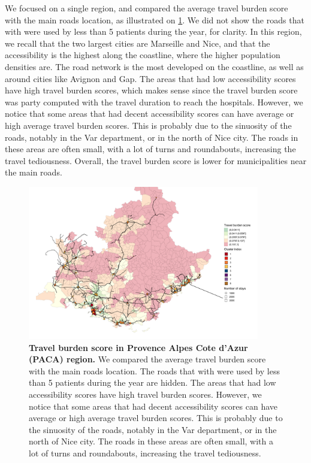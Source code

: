 We focused on a single region, and compared the average travel burden score with
the main roads location, as illustrated on \cref{fig:travel-burden-paca}. We did
not show the roads that with were used by less than 5 patients during the year,
for clarity. In this region, we recall that the two largest cities are Marseille
and Nice, and that the accessibility is the highest along the coastline, where
the higher population densities are. The road network is the most developed on
the coastline, as well as around cities like Avignon and Gap. The areas that had
low accessibility scores have high travel burden scores, which makes sense since
the travel burden score was party computed with the travel duration to reach the
hospitals. However, we notice that some areas that had decent accessibility
scores can have average or high average travel burden scores. This is probably
due to the sinuosity of the roads, notably in the Var department, or in the
north of Nice city. The roads in these areas are often small, with a lot of
turns and roundabouts, increasing the travel tediousness. Overall, the travel
burden score is lower for municipalities near the main roads.

\begin{figure}[h!]
    \includegraphics[width=0.9\textwidth]{images/routes/fig7.png}
    \centering
    \caption{
        \textbf{Travel burden score in Provence Alpes Cote d'Azur (PACA) region.}
        We compared the average travel burden score with the main roads
        location. The roads that with were used by less than 5 patients during
        the year are hidden. The areas that had low accessibility scores have
        high travel burden scores. However, we notice that some areas that had decent
        accessibility scores can have average or high average travel burden
        scores. This is probably due to the sinuosity of the roads, notably in
        the Var department, or in the north of Nice city. The roads in these
        areas are often small, with a lot of turns and roundabouts, increasing
        the travel tediousness. }
    \label{fig:travel-burden-paca}
\end{figure}

